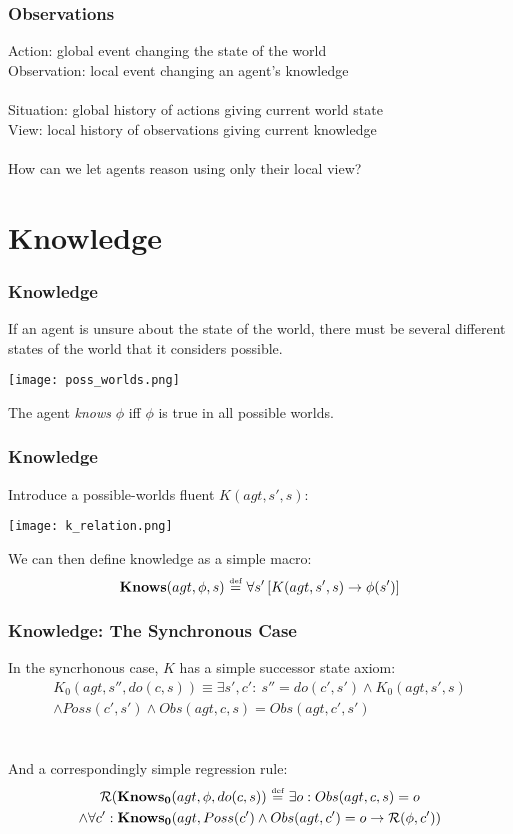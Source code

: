 \documentclass{beamer}
\newcommand{\isdef}{\hbox{$\stackrel{\mbox{\tiny def}}{=}$}}
\newcommand{\Reg}{\mathcal{R}}
\newcommand{\KnowsZ}{\mathbf{Knows_{0}}}
\begin{document}
\begin{frame}
\frametitle{Observations}
Action:  global event changing the state of the world\\
Observation:  local event changing an agent's knowledge
\ \\
\ \\
Situation:  global history of actions giving current world state\\
View:  local history of observations giving current knowledge
\ \\
\ \\
\pause
How can we let agents reason using only their local view?
\end{frame}

\section{Knowledge}

\begin{frame}
\frametitle{Knowledge}
If an agent is unsure about the state of the world, there must be several
different states of the world that it considers possible.

\begin{center}
  \texttt{[image: poss\_worlds.png]}
\end{center}

The agent \emph{knows} $\phi$ iff $\phi$ is true in all possible worlds.
\end{frame}

\begin{frame}
\frametitle{Knowledge}
Introduce a possible-worlds fluent $K(agt,s',s)$:

\begin{center}
  \texttt{[image: k\_relation.png]}
\end{center}

We can then define knowledge as a simple macro:
\[ \mathbf{Knows}(agt,\phi,s)\ \isdef\ \forall s'\left[K(agt,s',s)\rightarrow \phi(s')\right] \]
\end{frame}

\begin{frame}
\frametitle{Knowledge: The Synchronous Case}
In the syncrhonous case, $K$ has a simple successor state axiom:
\begin{multline*}
 K_0(agt,s'',do(c,s)) \equiv \exists s',c':\ s''=do(c',s') \wedge K_0(agt,s',s)\\
  \wedge Poss(c',s') \wedge Obs(agt,c,s) = Obs(agt,c',s')
\end{multline*}
\ \\
\ \\
And a correspondingly simple regression rule:
\begin{multline*}
 \Reg(\KnowsZ(agt,\phi,do(c,s))\ \isdef\ \exists o: Obs(agt,c,s)=o\\
  \wedge \forall c': \KnowsZ(agt,Poss(c')\wedge Obs(agt,c')=o \rightarrow \Reg(\phi,c'))
\end{multline*}

\end{frame}
\end{document}
